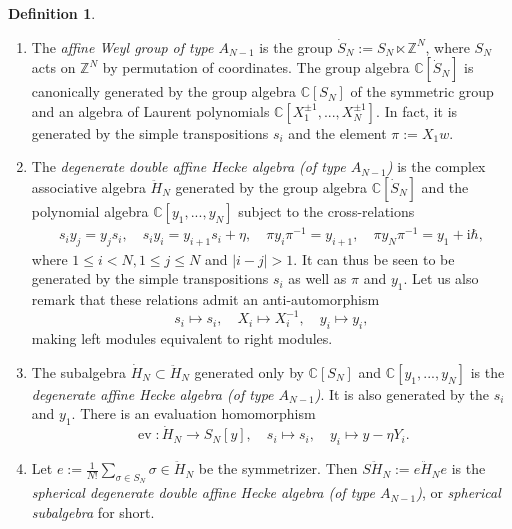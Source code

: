 \documentclass[11pt]{report}
\theoremstyle{definition}
\newtheorem{definition}[theorem]{Definition}
\theoremstyle{remark}
\theoremstyle{remark}
\newcommand{\Z}{\mathbb{Z}}
\newcommand{\C}{\mathbb{C}}
\newcommand{\I}{\mathrm{i}}
\begin{document}
\begin{definition}
\begin{enumerate}[label=(\roman*)]
\item The \emph{affine Weyl group of type $A_{N-1}$} is the group $\dot S_N := S_N \ltimes \Z^N$, where $S_N$ acts on $\Z^N$ by permutation of coordinates. The group algebra $\C[\dot S_N]$ is canonically generated by the group algebra $\C[S_N]$ of the symmetric group and an algebra of Laurent polynomials $\C[X_1^{\pm 1},...,X_N^{\pm 1}]$. In fact, it is generated by the simple transpositions $s_i$ and the element $\pi := X_1 w$.
\item The \emph{degenerate double affine Hecke algebra (of type $A_{N-1}$)} is the complex associative algebra $\ddot H_N$ generated by the group algebra $\C[\dot S_N]$ and the polynomial algebra $\C[y_1,...,y_N]$ subject to the cross-relations
\begin{align*}
s_i y_j = y_j s_i, \quad s_i y_i = y_{i+1} s_i + \eta, \quad \pi y_i \pi^{-1} = y_{i+1}, \quad \pi y_N \pi^{-1} = y_1 + \I \hbar,
\end{align*}
where $1 \leq i < N, 1 \leq j \leq N$ and $|i-j|>1$. It can thus be seen to be generated by the simple transpositions $s_i$ as well as $\pi$ and $y_1$. Let us also remark that these relations admit an anti-automorphism
\begin{equation*}
s_i \mapsto s_i, \quad X_i \mapsto X_i^{-1}, \quad y_i \mapsto y_i,
\end{equation*}
making left modules equivalent to right modules.
\item The subalgebra $\dot H_N \subset \ddot H_N$ generated only by $\C[S_N]$ and $\C[y_1,...,y_N]$ is the \emph{degenerate affine Hecke algebra (of type $A_{N-1}$)}. It is also generated by the $s_i$ and $y_1$. There is an evaluation homomorphism
\begin{equation}\label{equation:degHeckeEval}
\operatorname{ev}: \dot H_N \to S_N[y], \quad s_i \mapsto s_i, \quad y_i \mapsto y - \eta Y_i.
\end{equation}
\item Let $e := \frac{1}{N!}\sum_{\sigma \in S_N} \sigma \in \ddot H_N$ be the symmetrizer. Then $S\ddot H_N := e \ddot H_N e$ is the \emph{spherical degenerate double affine Hecke algebra (of type $A_{N-1}$)}, or \emph{spherical subalgebra} for short.
\end{enumerate}
\end{definition}
\end{document}
